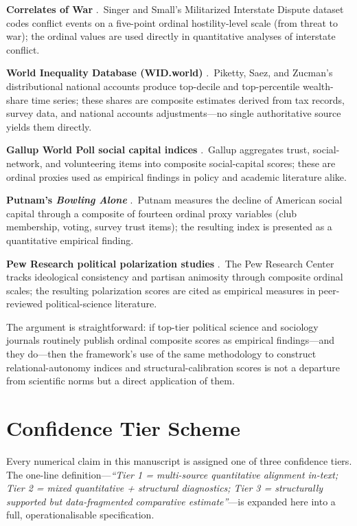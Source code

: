 \documentclass[12pt,openany]{book}
\numberwithin{equation}{chapter}
\begin{document}
\textbf{Correlates of War} \cite{correlates_of_war}.\ Singer and Small's Militarized Interstate Dispute dataset codes conflict events on a five-point ordinal hostility-level scale (from threat to war); the ordinal values are used directly in quantitative analyses of interstate conflict.

\textbf{World Inequality Database (WID.world)} \cite{piketty_wid}.\ Piketty, Saez, and Zucman's distributional national accounts produce top-decile and top-percentile wealth-share time series; these shares are composite estimates derived from tax records, survey data, and national accounts adjustments---no single authoritative source yields them directly.

\textbf{Gallup World Poll social capital indices} \cite{gallup_social}.\ Gallup aggregates trust, social-network, and volunteering items into composite social-capital scores; these are ordinal proxies used as empirical findings in policy and academic literature alike.

\textbf{Putnam's \textit{Bowling Alone}} \cite{putnam_bowling}.\ Putnam measures the decline of American social capital through a composite of fourteen ordinal proxy variables (club membership, voting, survey trust items); the resulting index is presented as a quantitative empirical finding.

\textbf{Pew Research political polarization studies} \cite{pew_polarization}.\ The Pew Research Center tracks ideological consistency and partisan animosity through composite ordinal scales; the resulting polarization scores are cited as empirical measures in peer-reviewed political-science literature.

The argument is straightforward: if top-tier political science and sociology journals routinely publish ordinal composite scores as empirical findings---and they do---then the framework's use of the same methodology to construct relational-autonomy indices and structural-calibration scores is not a departure from scientific norms but a direct application of them.

\section*{Confidence Tier Scheme}

Every numerical claim in this manuscript is assigned one of three confidence tiers. The one-line definition---\textit{``Tier 1 = multi-source quantitative alignment in-text; Tier 2 = mixed quantitative + structural diagnostics; Tier 3 = structurally supported but data-fragmented comparative estimate''}---is expanded here into a full, operationalisable specification.
\end{document}

